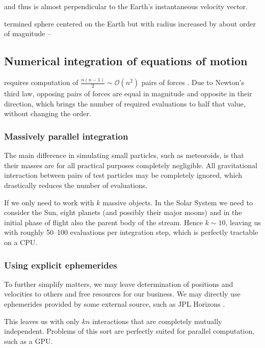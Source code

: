     and thus is almost perpendicular to the Earth's instantaneous velocity vector.



    termined sphere centered on the Earth but with
    radius increased by about  order of magnitude --

    \subsection{Numerical integration of equations of motion} \label{asi}
        requires computation of $\frac{n\left(n - 1\right)}{2} \sim \mathcal{O}(n^2)$ pairs of forces \cite{...}.
        Due to Newton's third law, opposing pairs of forces are equal in magnitude and opposite in their direction,
        which brings the number of required evaluations to half that value, without changing the order.

        \subsubsection{Massively parallel integration} \label{asip}
            The main difference in simulating small particles, such as meteoroids,
            is that their masses are for all practical purposes completely negligible.
            All gravitational interaction between pairs of test particles may be completely ignored,
            which drastically reduces the number of evaluations.

            If we only need to work with $k$ massive objects.
            In the Solar System we need to consider the Sun, eight planets (and possibly their major moons)
            and in the initial phase of flight also the parent body of the stream.
            Hence $k \sim 10$, leaving us with roughly 50--100 evaluations per integration step,
            which is perfectly tractable on a CPU.

        \subsubsection{Using explicit ephemerides} \label{asie}
            To further simplify matters, we may leave determination of positions and velocities to others
            and free resources for our business.
            We may directly use ephemerides provided by some external source, such as JPL Horizons \cite{...}.

            This leaves us with only $kn$ interactions that are completely mutually independent.
            Problems of this sort are perfectly suited for parallel computation, such as a GPU.

